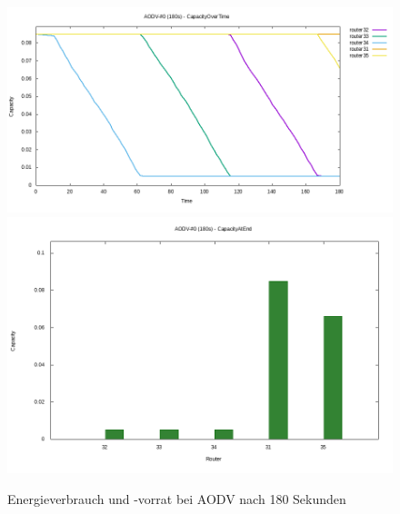 \begin{figure}
  \centering
  \includegraphics[scale=0.425]{bilder/aodv3.png}
  \includegraphics[scale=0.425]{bilder/aodv4.png}
  \caption{Energieverbrauch und -vorrat bei AODV nach 180 Sekunden}
  \label{image:omnet:aodv3}
\end{figure}

